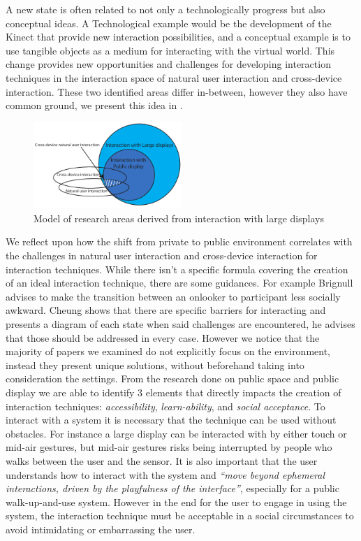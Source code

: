 A new state is often related to not only a technologically progress but also conceptual ideas. A Technological example would be the development of the Kinect that provide new interaction possibilities\cite{Wilson:2010}, and a conceptual example is to use tangible objects as a medium for interacting with the virtual world\cite{Rekimoto:1997, Keefe:2001}.
This change provides new opportunities and challenges for developing interaction techniques in the interaction space of natural user interaction and cross-device interaction. These two identified areas differ in-between, however they also have common ground, we present this idea in .\\
\begin{figure}[H]
\centering
\includegraphics[width=0.5\textwidth]{docs/research_areas.pdf}
\caption{Model of research areas derived from interaction with large displays}
\label{fig:litreview}
\end{figure}
We reflect upon how the shift from private to public environment correlates with the challenges in natural user interaction and cross-device interaction for interaction techniques.
While there isn't a specific formula covering the creation of an ideal interaction technique, there are some guidances. For example Brignull\cite{Brignull:2003} advises to make the transition between an onlooker to participant less socially awkward. Cheung\cite{Cheung:2014} shows that there are specific barriers for interacting and presents a diagram of each state when said challenges are encountered, he advises that those should be addressed in every case. However we notice that the majority of papers we examined do not explicitly focus on the environment, instead they present unique solutions, without beforehand taking into consideration the settings.
From the research done on public space and public display we are able to identify 3 elements that directly impacts the creation of interaction techniques: \emph{accessibility}, \emph{learn-ability}, and \emph{social acceptance}. To interact with a system it is necessary that the technique can be used without obstacles. For instance a large display can be interacted with by either touch or mid-air gestures, but mid-air gestures risks being interrupted by people who walks between the user and the sensor. It is also important that the user understands how to interact with the system and \emph{``move beyond ephemeral interactions, driven by the playfulness of the interface''}\cite{Jacucci:2010}, especially for a public walk-up-and-use system. However in the end for the user to engage in using the system, the interaction technique must be acceptable in a social circumstances to avoid intimidating or embarrassing the user. 

